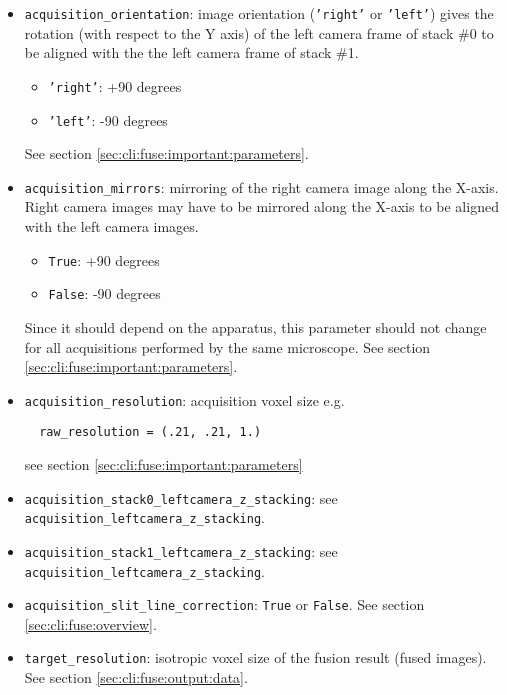 \begin{itemize}
\itemsep -0.5ex
\item \texttt{acquisition\_orientation}:
  image orientation (\texttt{'right'} or \texttt{'left'})
  gives the rotation (with respect to the Y axis) of the left camera 
  frame of stack \#0 to be aligned with the the left camera 
  frame of stack \#1.
  \begin{itemize}
  \itemsep -0.5ex
  \item \texttt{'right'}: +90 degrees
  \item \texttt{'left'}: -90 degrees
  \end{itemize}
  See section \ref{sec:cli:fuse:important:parameters}.
\item \texttt{acquisition\_mirrors}:
  mirroring of the right camera image along the X-axis.
  Right camera images may have to be mirrored along the X-axis 
  to be aligned with the left camera images.
  \begin{itemize}
  \itemsep -0.5ex
  \item \texttt{True}: +90 degrees
  \item \texttt{False}: -90 degrees
  \end{itemize}
  Since it should depend on the apparatus,
  this parameter should not change for all acquisitions 
  performed by the same microscope.
  See section \ref{sec:cli:fuse:important:parameters}.
\item \texttt{acquisition\_resolution}:
  acquisition voxel size
  e.g. 
  \begin{verbatim}
  raw_resolution = (.21, .21, 1.)
  \end{verbatim}
  see section \ref{sec:cli:fuse:important:parameters}
\item \texttt{acquisition\_stack0\_leftcamera\_z\_stacking}:
  see \texttt{acquisition\_leftcamera\_z\_stacking}.
\item \texttt{acquisition\_stack1\_leftcamera\_z\_stacking}:
  see \texttt{acquisition\_leftcamera\_z\_stacking}.
\item \texttt{acquisition\_slit\_line\_correction}:
  \texttt{True} or \texttt{False}.
  See section \ref{sec:cli:fuse:overview}.
\item \texttt{target\_resolution}:
  isotropic voxel size of the fusion result (fused images).
  See section \ref{sec:cli:fuse:output:data}.
  

\end{itemize}
